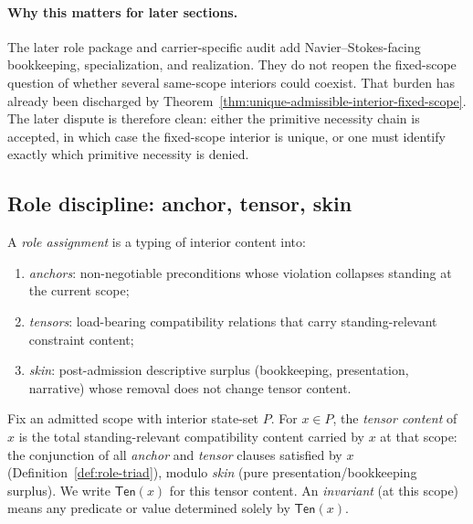 \paragraph{Why this matters for later sections.}
The later role package and carrier-specific audit add Navier--Stokes-facing bookkeeping, specialization, and realization. They do not reopen the fixed-scope question of whether several same-scope interiors could coexist. That burden has already been discharged by Theorem~\ref{thm:unique-admissible-interior-fixed-scope}. The later dispute is therefore clean: either the primitive necessity chain is accepted, in which case the fixed-scope interior is unique, or one must identify exactly which primitive necessity is denied.

\subsection{Role discipline: anchor, tensor, skin}

\begin{definition}\label{def:role-triad}
A \emph{role assignment} is a typing of interior content into:
\begin{enumerate}[label=(\roman*), leftmargin=2.2em]
\item \emph{anchors}: non-negotiable preconditions whose violation collapses standing at the current scope;
\item \emph{tensors}: load-bearing compatibility relations that carry standing-relevant constraint content;
\item \emph{skin}: post-admission descriptive surplus (bookkeeping, presentation, narrative) whose removal
does not change tensor content.
\end{enumerate}
\end{definition}

\begin{definition}\label{def:tensor-content}
Fix an admitted scope with interior state-set $P$.
For $x\in P$, the \emph{tensor content} of $x$ is the total standing-relevant compatibility content
carried by $x$ at that scope: the conjunction of all \emph{anchor} and \emph{tensor} clauses satisfied
by $x$ (Definition~\ref{def:role-triad}), modulo \emph{skin} (pure presentation/bookkeeping surplus).
We write $\mathsf{Ten}(x)$ for this tensor content.
An \emph{invariant} (at this scope) means any predicate or value determined solely by $\mathsf{Ten}(x)$.
\end{definition}


